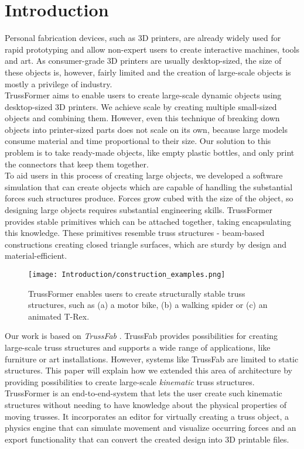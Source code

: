 \chapter{Introduction}\label{ch:introduction}
Personal fabrication devices, such as 3D printers, are already widely used for rapid prototyping and allow non-expert users to create interactive machines, tools and art. As consumer-grade 3D printers are usually desktop-sized, the size of these objects is, however, fairly limited and the creation of large-scale objects is mostly a privilege of industry.\\
TrussFormer \cite{kovacs:2018} aims to enable users to create large-scale dynamic objects using desktop-sized 3D printers. We achieve scale by creating multiple small-sized objects and combining them. However, even this technique of breaking down objects into printer-sized parts does not scale on its own, because large models consume material and time proportional to their size. Our solution to this problem is to take ready-made objects, like empty plastic bottles, and only print the connectors that keep them together.\\
To aid users in this process of creating large objects, we developed a software simulation that can create objects which are capable of handling the substantial forces such structures produce. Forces grow cubed with the size of the object, so designing large objects requires substantial engineering skills. TrussFormer provides stable primitives which can be attached together, taking encapsulating this knowledge. These primitives resemble truss structures - beam-based constructions creating closed triangle surfaces, which are sturdy by design and material-efficient.\\
\begin{figure}[h!]
    \texttt{[image: Introduction/construction\_examples.png]}
    \centering
    \caption{TrussFormer enables users to create structurally stable truss structures, such as (a) a motor bike, (b) a walking spider or (c) an animated T-Rex.}
    \label{fig:examples}
\end{figure}
Our work is based on \textit{TrussFab} \cite{kovacs:2017}. TrussFab provides possibilities for creating large-scale truss structures and supports a wide range of applications, like furniture or art installations. However, systems like TrussFab are limited to static structures. This paper will explain how we extended this area of architecture by providing possibilities to create large-scale \textit{kinematic} truss structures.\\
TrussFormer is an end-to-end-system that lets the user create such kinematic structures without needing to have knowledge about the physical properties of moving trusses. It incorporates an editor for virtually creating a truss object, a physics engine that can simulate movement and visualize occurring forces and an export functionality that can convert the created design into 3D printable files.


